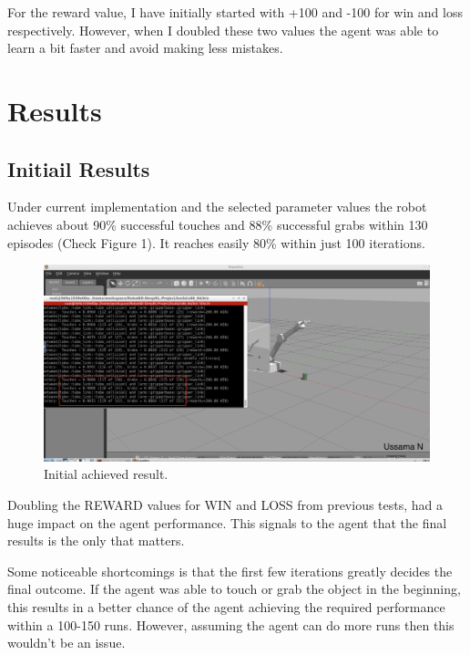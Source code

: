 \documentclass{article}
\begin{document}
For the reward value, I have initially started with +100 and -100 for win and loss respectively. However, when I doubled these two values the agent was able to learn a bit faster and avoid making less mistakes.

\section{Results}

\subsection{Initiail Results}
Under current implementation and the selected parameter values the robot achieves about 90\% successful touches and 88\% successful grabs within 130 episodes (Check Figure 1). It reaches easily 80\% within just 100 iterations.

\begin{figure}[!thpb]
      \centering
      \includegraphics[width=\linewidth]{initial-result.png}
      \caption{Initial achieved result.}
      \label{fig:robot1}
\end{figure}


Doubling the REWARD values for WIN and LOSS from previous tests, had a huge impact on the agent performance. This signals to the agent that the final results is the only that matters.

Some noticeable shortcomings is that the first few iterations greatly decides the final outcome. If the agent was able to touch or grab the object in the beginning, this results in a better chance of the agent achieving the required performance within a 100-150 runs. However, assuming the agent can do more runs then this wouldn't be an issue.
\end{document}
